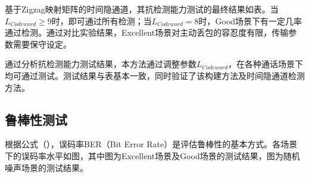 基于Zigzag映射矩阵的时间隐通道，其抗检测能力测试的最终结果如表。当$L_{Codeword}\ge 9$时，即可通过所有检测；当$L_{Codeword} = 8$时，Good场景下有一定几率通过检测。通过对比实验结果，Excellent场景对主动丢包的容忍度有限，传输参数需要保守设定。

通过分析抗检测能力测试结果，本方法通过调整参数$L_{Codeword}$，在各种通话场景下均可通过测试。测试结果与表基本一致，同时验证了该构建方法及时间隐通道检测方法。

\subsection{鲁棒性测试}
\label{chap:zigzag:results:robustness}


根据公式（），误码率BER（Bit Error Rate）是评估鲁棒性的基本方式。各场景下的误码率水平如图，其中图为Excellent场景及Good场景的测试结果，图为随机噪声场景的测试结果。

